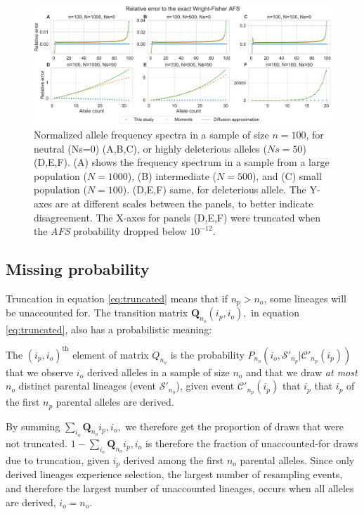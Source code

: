\documentclass[review]{elsarticle}
\begin{document}
\begin{figure}
  \centering
  \includegraphics[width=0.7\textheight]{fig/strong_selection_six_panel.pdf}
  \caption{Normalized allele frequency spectra in a sample of size $n=100$, for neutral (Ns=0)
    (A,B,C), or highly deleterious alleles ($Ns=50$) (D,E,F). (A) shows the frequency spectrum in a
    sample from a large population ($N=1000$), (B) intermediate ($N=500$), and (C) small population
    ($N=100$). (D,E,F) same, for deleterious allele. The Y-axes are at different scales between the
    panels, to better indicate disagreement. The X-axes for panels (D,E,F) were truncated
    when the \textit{AFS} probability dropped below $10^{-12}$. }
  \label{fig:strong-selection}
\end{figure}

\subsection{Missing probability}
\label{subsec:missing}

Truncation in equation \ref{eq:truncated} means that if $n_p > n_o$, some lineages will be
unaccounted for. The transition matrix $\mathbf{Q}_{n_o}(i_p, i_o),$ in equation
\eqref{eq:truncated}, also has a probabilistic meaning:

The $(i_p,i_o)^\text{th}$ element of matrix $Q_{n_o}$ is the probability
$P_{n_o}(i_o, \mathcal{S'}_{n_p}| \mathcal{C'}_{n_p}(i_p))$ that we observe $i_o$ derived alleles in
a sample of size $n_o$ and that we draw \emph{at most} $n_o$ distinct parental lineages (event
$\mathcal{S'}_{n_o}$), given event $\mathcal{C'}_{n_p}(i_p)$ that $i_p$ that $i_p$ of the first
$n_p$ parental alleles are derived.

By summing $\sum_{i_o} \mathbf{Q}_{n_o}{i_p, i_o},$ we therefore get the proportion of draws that
were not truncated. $1-\sum_{i_o} \mathbf{Q}_{n_o}{i_p, i_o}$ is therefore the fraction of
unaccounted-for draws due to truncation, given $i_p$ derived among the first $n_o$ parental
alleles. Since only derived lineages experience selection, the largest number of resampling events,
and therefore the largest number of unaccounted lineages, occurs when all alleles are derived,
$i_o = n_o$.
\end{document}
